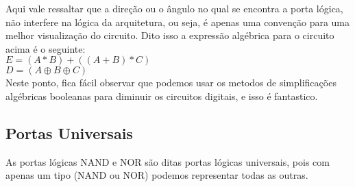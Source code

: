 \documentclass[12pt, onecolumn]{article}
\begin{document}
	Aqui vale ressaltar que a direção ou o ângulo no qual se encontra a porta 
	lógica, não interfere na lógica da arquitetura, ou seja, é apenas uma 
	convenção para uma melhor visualização do circuito. Dito isso
	a expressão algébrica para o circuito acima é o seguinte: \\
	\newline
	$E = (A*B) + ((A + B) * C)$ \\
	$D = (A \oplus B \oplus C)$ \\
	\newline
	Neste ponto, fica fácil observar que podemos usar os metodos de simplificações
	algébricas booleanas para diminuir os circuitos digitais, e isso é fantastico.

	\subsection{\centering Portas Universais}

	As portas lógicas NAND e NOR são ditas portas lógicas universais, pois
	com apenas um tipo (NAND ou NOR) podemos representar todas as outras.

	
        
\end{document}
